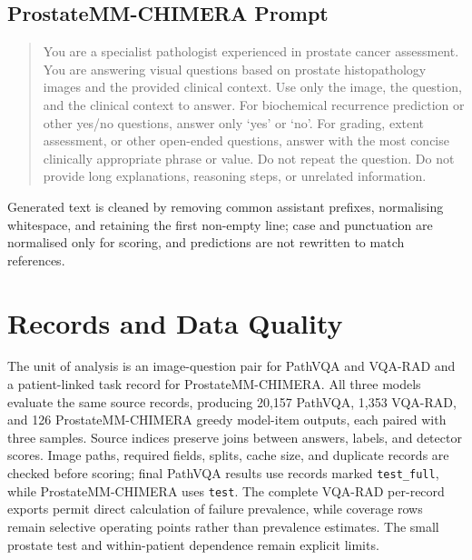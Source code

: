 \subsection{ProstateMM-CHIMERA Prompt}

\begin{quote}
You are a specialist pathologist experienced in prostate cancer assessment. You are answering visual questions based on prostate histopathology images and the provided clinical context. Use only the image, the question, and the clinical context to answer. For biochemical recurrence prediction or other yes/no questions, answer only `yes' or `no'. For grading, extent assessment, or other open-ended questions, answer with the most concise clinically appropriate phrase or value. Do not repeat the question. Do not provide long explanations, reasoning steps, or unrelated information.
\end{quote}

Generated text is cleaned by removing common assistant prefixes, normalising whitespace, and retaining the first non-empty line; case and punctuation are normalised only for scoring, and predictions are not rewritten to match references.

\section{Records and Data Quality}

The unit of analysis is an image-question pair for PathVQA and VQA-RAD and a patient-linked task record for ProstateMM-CHIMERA. All three models evaluate the same source records, producing 20,157 PathVQA, 1,353 VQA-RAD, and 126 ProstateMM-CHIMERA greedy model-item outputs, each paired with three samples. Source indices preserve joins between answers, labels, and detector scores. Image paths, required fields, splits, cache size, and duplicate records are checked before scoring; final PathVQA results use records marked \texttt{test\_full}, while ProstateMM-CHIMERA uses \texttt{test}. The complete VQA-RAD per-record exports permit direct calculation of failure prevalence, while coverage rows remain selective operating points rather than prevalence estimates. The small prostate test and within-patient dependence remain explicit limits.
